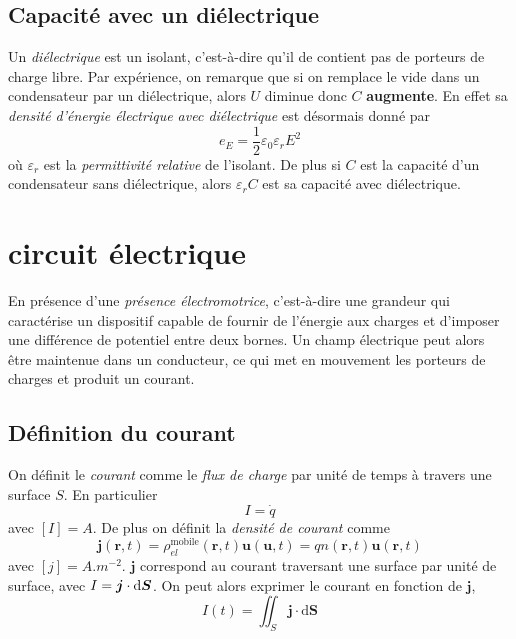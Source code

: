\documentclass[10pt]{article}
\numberwithin{equation}{section}
\begin{document}
\subsection{Capacité avec un diélectrique}

Un \emph{diélectrique} est un isolant, c'est-à-dire qu'il de contient pas de porteurs de charge libre. Par expérience, on remarque que si on remplace le vide dans un condensateur par un diélectrique, alors $U$ diminue donc $C$ \textbf{augmente}. En effet sa \emph{densité d'énergie électrique avec diélectrique} est désormais donné par
\[
\boxed{e_E =  \frac12 \varepsilon_0 \varepsilon_r E^2}
\]
où $\varepsilon_r$ est la \emph{permittivité relative} de l'isolant. De plus si $C$ est la capacité d'un condensateur sans diélectrique, alors $\varepsilon_r C$ est sa capacité avec diélectrique.

\clearpage

\section{circuit électrique}
En présence d'une \emph{présence électromotrice}, c'est-à-dire une grandeur qui caractérise un dispositif capable de fournir de l'énergie aux charges et d'imposer une différence de potentiel entre deux bornes. Un champ électrique peut alors être maintenue dans un conducteur, ce qui met en mouvement les porteurs de charges et produit un courant.

\subsection{Définition du courant}
On définit le \emph{courant} comme le \emph{flux de charge} par unité de temps à travers une surface $S$. En particulier
\[
\boxed{I = \dot q}
\]
avec $[I] = \unit{A}$. De plus on définit la \emph{densité de courant} comme
\[
\bm j (\bm r, t) = \rho_{el}^{\mathrm{mobile}} (\bm r, t) \bm u(\bm u, t) = q n(\bm r, t) \bm u(\bm r, t)
\]
avec $[j] = \unit{A.m^{-2}}$. $\bm j$ correspond au courant traversant une surface par unité de surface, avec $\mathrm \bm I = \bm j \cdot \mathrm d \bm S$. On peut alors exprimer le courant en fonction de $\bm j$,
\[
I(t) = \iint_S \bm j \cdot \mathrm d \bm S
\]
\end{document}
